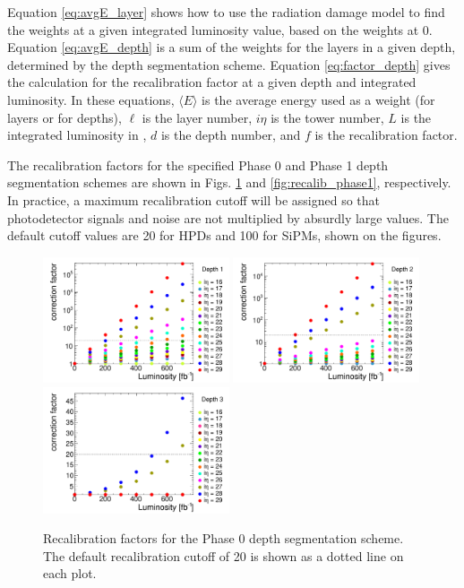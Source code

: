 Equation \eqref{eq:avgE_layer} shows how to use the radiation damage model to find the weights at a given integrated luminosity value, based on the weights at 0\fbinv. Equation \eqref{eq:avgE_depth} is a sum of the weights for the layers in a given depth, determined by the depth segmentation scheme. Equation \eqref{eq:factor_depth} gives the calculation for the recalibration factor at a given depth and integrated luminosity. In these equations, $\langle E \rangle$ is the average energy used as a weight (for layers or for depths), $\ell$ is the layer number, $i\eta$ is the tower number, $L$ is the integrated luminosity in \fbinv, $d$ is the depth number, and $f$ is the recalibration factor.

The recalibration factors for the specified Phase 0 and Phase 1 depth segmentation schemes are shown in Figs. \ref{fig:recalib_phase0} and \ref{fig:recalib_phase1}, respectively. In practice, a maximum recalibration cutoff will be assigned so that photodetector signals and noise are not multiplied by absurdly large values. The default cutoff values are 20 for HPDs and 100 for SiPMs, shown on the figures. %

\begin{figure}[hbtp]
  \begin{center}
    \includegraphics[width=0.49\textwidth]{figures/mean_corr_comp_depth_1_phase0.pdf}
    \includegraphics[width=0.49\textwidth]{figures/mean_corr_comp_depth_2_phase0.pdf}
    \includegraphics[width=0.49\textwidth]{figures/mean_corr_comp_depth_3_phase0.pdf}
    \caption{Recalibration factors for the Phase 0 depth segmentation scheme. The default recalibration cutoff of 20 is shown as a dotted line on each plot.}
    \label{fig:recalib_phase0}
  \end{center}
\end{figure}

